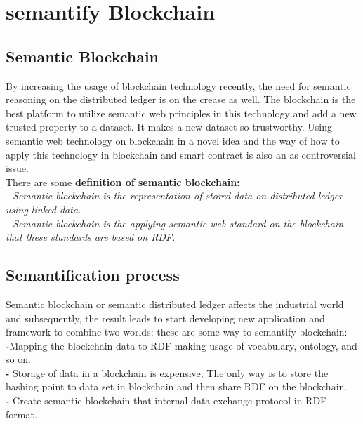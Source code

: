 \section{semantify Blockchain}
\subsection{Semantic Blockchain}
By increasing the usage of blockchain technology recently, the need for semantic reasoning on the distributed ledger is on the crease as well. The blockchain is the best platform to utilize semantic web principles in this technology and add a new trusted property to a dataset. It makes a new dataset so trustworthy. 
Using semantic web technology on blockchain in a novel idea and the way of how to apply this technology in blockchain and smart contract is also an as controversial issue.\\
There are some \textbf{definition of semantic blockchain:}\\ 
\textit{- Semantic blockchain is the representation of stored data on distributed ledger using linked data. }\\
\textit{- Semantic blockchain is the applying semantic web standard on the blockchain that these standards are based on RDF.}

\subsection{Semantification process}
Semantic blockchain or semantic distributed ledger affects the industrial world and subsequently, the result leads to start developing new application and framework to combine two worlds:
these are some way to semantify blockchain:\\
\textbf{-}Mapping the blockchain data to RDF making usage of vocabulary, ontology, and so on.\\
\textbf{-} Storage of data in a blockchain is expensive, The only way is to store the hashing point to data set in blockchain and then share RDF on the blockchain. \\
\textbf{-} Create semantic blockchain that internal data exchange protocol in RDF format\cite{Hector}. \\

